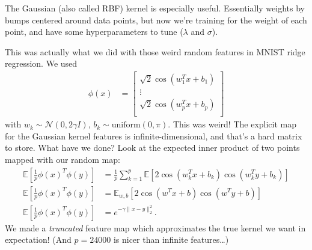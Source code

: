 \documentclass[11pt,letterpaper]{article}
\theoremstyle{definition}
\theoremstyle{plain}
\numberwithin{equation}{section}
\numberwithin{figure}{section}
\begin{document}
The Gaussian (also called RBF) kernel is especially useful. Essentially weights by bumps centered around data points, but now we're training for the weight of each point, and have some hyperparameters to tune ($\lambda$ and $\sigma$).

This was actually what we did with those weird random features in MNIST ridge regression. We used
%
\begin{align}
	\phi(x) &= \begin{bmatrix}\sqrt{2}\cos(w_1^T x + b_1)\\\vdots\\\sqrt{2}\cos(w_p^T x + b_p)\\\end{bmatrix}
\end{align}
%
with $w_k \sim \mathcal{N}(0,2\gamma I)$, $b_k \sim \mathrm{uniform}(0,\pi)$. This was weird! The explicit map for the Gaussian kernel features is infinite-dimensional, and that's a hard matrix to store. What have we done? Look at the expected inner product of two points mapped with our random map:
%
\begin{align}
	\mathbb{E}\left[\frac{1}{p}\phi(x)^T \phi(y)\right] &= \frac{1}{p} \sum_{k=1}^p \mathbb{E}\left[2\cos(w_k^T x + b_k)\cos(w_k^T y + b_k)\right]\\
	\mathbb{E}\left[\frac{1}{p}\phi(x)^T \phi(y)\right] &= \mathbb{E}_{w,b} \left[2\cos(w^T x + b)\cos(w^T y + b)\right]\\
	\mathbb{E}\left[\frac{1}{p}\phi(x)^T \phi(y)\right] &= e^{-\gamma\|x-y\|_2^2}.
\end{align}
%
We made a \emph{truncated} feature map which approximates the true kernel we want in expectation! (And $p=24000$ is nicer than infinite features\ldots)
\end{document}
